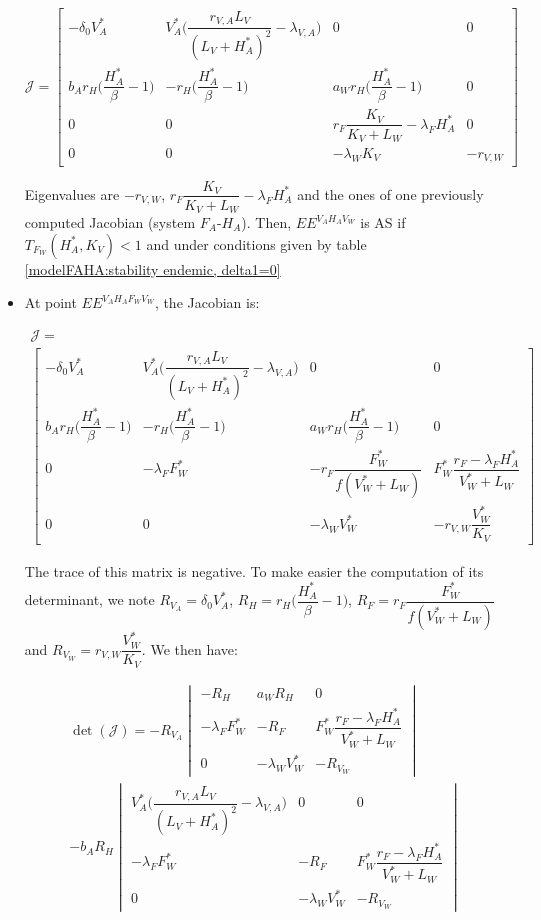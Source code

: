 \documentclass{article}
\newcommand{\lva}{\lambda_{V, A}}
\newcommand{\lfw}{\lambda_{F}}
\newcommand{\lfv}{\lambda_{W}}
\begin{document}
\begin{itemize}
$$
\mathcal{J} = \begin{bmatrix}
- \delta_0 V_A^* & V_A^*\Big(\dfrac{r_{V,A}L_V}{(L_V + H_A^*)^2}-\lva\Big) & 0 & 0 \\
b_A r_H \Big(\dfrac{H_A^*}{\beta}-1 \Big) & -r_H \Big(\dfrac{H_A^*}{\beta}-1 \Big) & a_W r_H \Big(\dfrac{H_A^*}{\beta}-1 \Big) & 0 \\
0 & 0 & r_F \dfrac{K_V}{K_V + L_W} - \lfw H_A^* & 0 \\
0 & 0 & -\lfv K_V & -r_{V,W}
\end{bmatrix}
$$

Eigenvalues are $-r_{V,W}$, $r_F \dfrac{K_V}{K_V + L_W} - \lfw H_A^*$ and the ones of one previously computed Jacobian (system $F_A$-$H_A$). Then, $EE^{V_AH_AV_W}$ is AS if $T_{F_W}(H_A^*, K_V) < 1$ and under conditions given by table \ref{modelFAHA:stability endemic, delta1=0}



\item At point $EE^{V_AH_AF_WV_W}$, the Jacobian is:

\begin{multline}
\mathcal{J} = \\
\begin{bmatrix}
- \delta_0 V_A^* & V_A^*\Big(\dfrac{r_{V,A}L_V}{(L_V + H_A^*)^2}-\lva\Big) & 0 & 0 \\
b_A r_H \Big(\dfrac{H_A^*}{\beta}-1 \Big) & -r_H \Big(\dfrac{H_A^*}{\beta}-1 \Big) & a_W r_H \Big(\dfrac{H_A^*}{\beta}-1 \Big) & 0 \\
0 & -\lfw F_W^* & -r_F \dfrac{F_W^*}{f(V_W^* + L_W)} & F_W^* \dfrac{r_F - \lfw H_A^*}{V_W^* + L_W} \\
0 & 0 & -\lfv V_W^* & -r_{V,W}\dfrac{V^*_W}{K_V}
\end{bmatrix}
\end{multline}



The trace of this matrix is negative. To make easier the computation of its determinant, we note $R_{V_A} = \delta_0 V_A^*$,  $R_H = r_H \Big(\dfrac{H_A^*}{\beta}-1 \Big)$, $R_F = r_F \dfrac{F_W^*}{f(V_W^* + L_W)}$ and $R_{V_W} = r_{V,W}\dfrac{V^*_W}{K_V}$. We then have:

\begin{multline*}
\det(\mathcal{J}) = -R_{V_A} \begin{vmatrix}
-R_H & a_W R_H & 0 \\
-\lfw F_W^* & -R_F & F_W^* \dfrac{r_F - \lfw H_A^*}{V_W^* + L_W} \\
0 & -\lfv V_W^* & -R_{V_W}
\end{vmatrix} \\- b_A R_H \begin{vmatrix}
V_A^*\Big(\dfrac{r_{V,A}L_V}{(L_V + H_A^*)^2}-\lva\Big) & 0 & 0 \\
-\lfw F_W^* & -R_F & F_W^* \dfrac{r_F - \lfw H_A^*}{V_W^* + L_W} \\
0 & -\lfv V_W^* & -R_{V_W}
\end{vmatrix}
\end{multline*}


\end{itemize}
\end{document}
